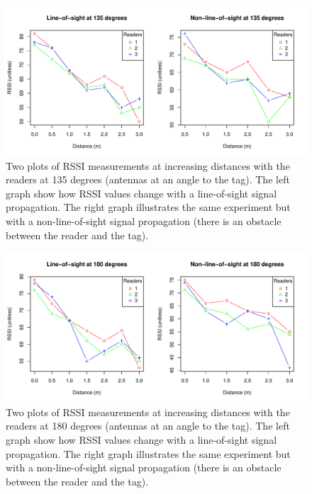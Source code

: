 \begin{figure}[H]
	\begin{center}
		\includegraphics[width=1\textwidth]{figures/rssi_distance_3m_135deg}
		\caption{Two plots of RSSI measurements at increasing distances with the readers at 135 degrees (antennas at an angle to the tag). The left graph show how RSSI values change with a line-of-sight signal propagation. The right graph illustrates the same experiment but with a non-line-of-sight signal propagation (there is an obstacle between the reader and the tag).}
	\end{center}
\end{figure}

\begin{figure}[H]
	\begin{center}
		\includegraphics[width=1\textwidth]{figures/rssi_distance_3m_180deg}
		\caption{Two plots of RSSI measurements at increasing distances with the readers at 180 degrees (antennas at an angle to the tag). The left graph show how RSSI values change with a line-of-sight signal propagation. The right graph illustrates the same experiment but with a non-line-of-sight signal propagation (there is an obstacle between the reader and the tag).}
	\end{center}
\end{figure}

